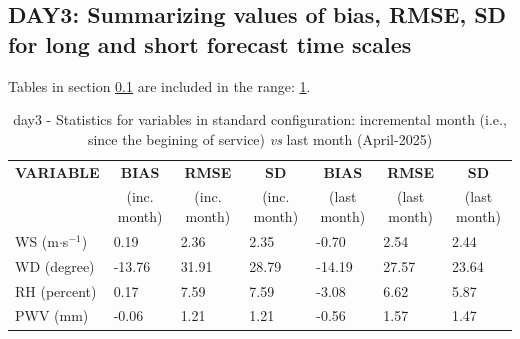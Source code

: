 \subsection{DAY3: Summarizing values of bias, RMSE, SD for long and short forecast time scales}\label{subsec:day3:stat}
Tables in section \ref{subsec:day3:stat} are included in the range: \ref{tab:day3:statBEF}.
\begin{table}[h!]
\begin{center}
\begin{tabular}{|l|l|l|l|l|l|l|}
\hline
\multicolumn{1}{|c|}{\cellcolor[HTML]{C0C0C0}\textbf{VARIABLE}} & \multicolumn{1}{c|}{\cellcolor[HTML]{C0C0C0}\textbf{BIAS}} & \multicolumn{1}{c|}{\cellcolor[HTML]{C0C0C0}\textbf{RMSE}} & \multicolumn{1}{c|}{\cellcolor[HTML]{C0C0C0}\textbf{SD}} & \multicolumn{1}{c|}{\cellcolor[HTML]{C0C0C0}\textbf{BIAS}} & \multicolumn{1}{c|}{\cellcolor[HTML]{C0C0C0}\textbf{RMSE}} & \multicolumn{1}{c|}{\cellcolor[HTML]{C0C0C0}\textbf{SD}}\\
\multicolumn{1}{|c|}{\cellcolor[HTML]{C0C0C0}} & \multicolumn{1}{c|}{\cellcolor[HTML]{C0C0C0}(inc. month)} & \multicolumn{1}{c|}{\cellcolor[HTML]{C0C0C0}(inc. month)} & \multicolumn{1}{c|}{\cellcolor[HTML]{C0C0C0}(inc. month)} & \multicolumn{1}{c|}{\cellcolor[HTML]{C0C0C0}(last month)} & \multicolumn{1}{c|}{\cellcolor[HTML]{C0C0C0}(last month)} & \multicolumn{1}{c|}{\cellcolor[HTML]{C0C0C0}(last month)}\\\hline
\cellcolor[HTML]{C0C0C0}WS (m$\cdot$s$^{-1}$) &      0.19  &      2.36  &      2.35  &     -0.70     &      2.54     &      2.44\\
\cellcolor[HTML]{C0C0C0}WD (degree)           &    -13.76  &     31.91  &     28.79  &    -14.19     &     27.57     &     23.64\\
\cellcolor[HTML]{C0C0C0}RH (percent)          &      0.17  &      7.59  &      7.59  &     -3.08     &      6.62     &      5.87\\
\cellcolor[HTML]{C0C0C0}PWV (mm)              &     -0.06 &      1.21 &      1.21 &     -0.56    &      1.57    &      1.47\\
\hline
\end{tabular}
\caption{day3 - Statistics for variables in standard configuration: incremental month (i.e., since the begining of service) \textit{vs} last month (April-2025)}\label{tab:day3:statBEF}
\end{center}
\end{table}

